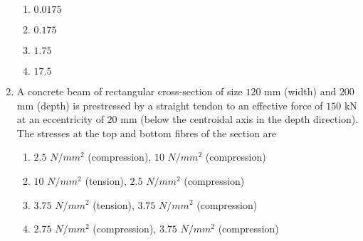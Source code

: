 \documentclass[journal,12pt,onecolumn]{IEEEtran}
\theoremstyle{remark}
\begin{document}
\begin{enumerate}[start=35]
		    \begin{enumerate}
			    \item $0.0175$
			    \item $0.175$
			    \item $1.75$
			    \item $17.5$\\
		    \end{enumerate}
	    \item A concrete beam of rectangular cross-section of size $120$ mm (width) and $200$ mm (depth) is prestressed by a straight tendon to an effective force of $150$ kN at an eccentricity of $20$ mm (below the centroidal axis in the depth direction). The stresses at the top and bottom fibres of the section are
		    \begin{enumerate}
			    \item $2.5$ $N/mm^2$ (compression), $10$ $N/mm^2$ (compression)
			    \item $10$ $N/mm^2$ (tension), $2.5$ $N/mm^2$ (compression)
			    \item $3.75$ $N/mm^2$ (tension), $3.75$ $N/mm^2$ (compression)
			    \item $2.75$ $N/mm^2$ (compression), $3.75$ $N/mm^2$ (compression)\\
		    \end{enumerate}


\end{enumerate}
\end{document}
